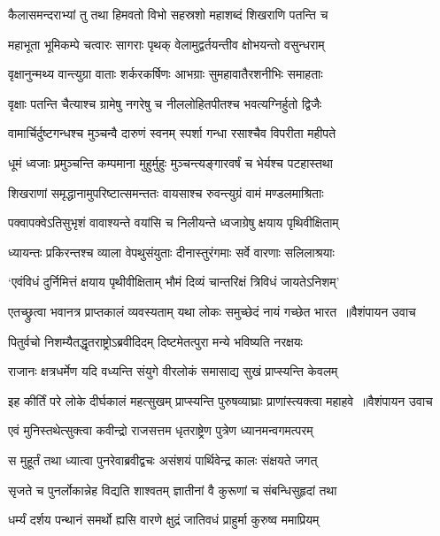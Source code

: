 \twolineshloka
{कैलासमन्दराभ्यां तु तथा हिमवतो विभो}
{सहस्रशो महाशब्दं शिखराणि पतन्ति च}


\twolineshloka
{महाभूता भूमिकम्पे चत्वारः सागराः पृथक्}
{वेलामुद्वर्तयन्तीव क्षोभयन्तो वसुन्धराम्}


\twolineshloka
{वृक्षानुन्मथ्य वान्त्युग्रा वाताः शर्करकर्षिणः}
{आभग्राः सुमहावातैरशनीभिः समाहताः}


\twolineshloka
{वृक्षाः पतन्ति चैत्याश्च ग्रामेषु नगरेषु च}
{नीललोहितपीतश्च भवत्यग्निर्हुतो द्विजैः}


\twolineshloka
{वामार्चिर्दुष्टगन्धश्च मुञ्चन्वै दारुणं स्वनम्}
{स्पर्शा गन्धा रसाश्चैव विपरीता महीपते}


\twolineshloka
{धूमं ध्वजाः प्रमुञ्चन्ति कम्पमाना मुहुर्मुहुः}
{मुञ्चन्त्यङ्गारवर्षं च भेर्यश्च पटहास्तथा}


\twolineshloka
{शिखराणां समृद्धानामुपरिष्टात्समन्ततः}
{वायसाश्च रुवन्त्युग्रं वामं मण्डलमाश्रिताः}


\twolineshloka
{पक्वापक्वेऽतिसुभृशं वावाश्यन्ते वयांसि च}
{निलीयन्ते ध्वजाग्रेषु क्षयाय पृथिवीक्षिताम्}


\twolineshloka
{ध्यायन्तः प्रकिरन्तश्च व्याला वेपथुसंयुताः}
{दीनास्तुरंगमाः सर्वे वारणाः सलिलाश्रयाः}


\twolineshloka
{`एवंविधं दुर्निमित्तं क्षयाय पृथीवीक्षिताम्}
{भौमं दिव्यं चान्तरिक्षं त्रिविधं जायतेऽनिशम्'}


\threelineshloka
{एतच्छ्रुत्वा भवानत्र प्राप्तकालं व्यवस्यताम्}
{यथा लोकः समुच्छेदं नायं गच्छेत भारत ॥वैशंपायन उवाच}
{}


\twolineshloka
{पितुर्वचो निशम्यैतद्धृतराष्ट्रोऽब्रवीदिदम्}
{दिष्टमेतत्पुरा मन्ये भविष्यति नरक्षयः}


\twolineshloka
{राजानः क्षत्रधर्मेण यदि वध्यन्ति संयुगे}
{वीरलोकं समासाद्य सुखं प्राप्स्यन्ति केवलम्}


\threelineshloka
{इह कीर्तिं परे लोके दीर्घकालं महत्सुखम्}
{प्राप्स्यन्ति पुरुषव्याघ्राः प्राणांस्त्यक्त्वा महाहवे ॥वैशंपायन उवाच}
{}


\twolineshloka
{एवं मुनिस्तथेत्सुक्त्वा कवीन्द्रो राजसत्तम}
{धृतराष्ट्रेण पुत्रेण ध्यानमन्वगमत्परम्}


\twolineshloka
{स मुहूर्तं तथा ध्यात्वा पुनरेवाब्रवीद्वचः}
{असंशयं पार्थिवेन्द्र कालः संक्षयते जगत्}


\twolineshloka
{सृजते च पुनर्लोकान्नेह विद्यति शाश्वतम्}
{ज्ञातीनां वै कुरूणां च संबन्धिसुहृदां तथा}


\twolineshloka
{धर्म्यं दर्शय पन्थानं समर्थो ह्यसि वारणे}
{क्षुद्रं जातिवधं प्राहुर्मा कुरुष्व ममाप्रियम्}


